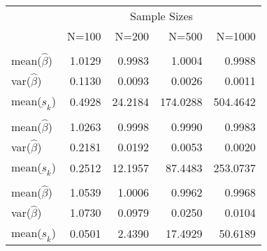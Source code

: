 
\begin{tabular}{lrrrr}
\toprule
\multicolumn{1}{c}{ } & \multicolumn{4}{c}{Sample Sizes} \\
\cmidrule(l{3pt}r{3pt}){2-5}
  & N=100 & N=200 & N=500 & N=1000\\
\midrule
\addlinespace[0.3em]
\multicolumn{5}{l}{\textbf{$ \rho = 0 $  }}\\
\hspace{1em}mean($\hat{\beta}$) & 1.0129 & 0.9983 & 1.0004 & 0.9988\\
\hspace{1em}var($\hat{\beta}$) & 0.1130 & 0.0093 & 0.0026 & 0.0011\\
\hspace{1em}mean($\underbar{s}_k$) & 0.4928 & 24.2184 & 174.0288 & 504.4642\\
\addlinespace[0.3em]
\multicolumn{5}{l}{\textbf{$ \rho = 0.5 $}}\\
\hspace{1em}mean($\hat{\beta}$) & 1.0263 & 0.9998 & 0.9990 & 0.9983\\
\hspace{1em}var($\hat{\beta}$) & 0.2181 & 0.0192 & 0.0053 & 0.0020\\
\hspace{1em}mean($\underbar{s}_k$) & 0.2512 & 12.1957 & 87.4483 & 253.0737\\
\addlinespace[0.3em]
\multicolumn{5}{l}{\textbf{$ \rho = 0.9 $}}\\
\hspace{1em}mean($\hat{\beta}$) & 1.0539 & 1.0006 & 0.9962 & 0.9968\\
\hspace{1em}var($\hat{\beta}$) & 1.0730 & 0.0979 & 0.0250 & 0.0104\\
\hspace{1em}mean($\underbar{s}_k$) & 0.0501 & 2.4390 & 17.4929 & 50.6189\\
\bottomrule
\end{tabular}
